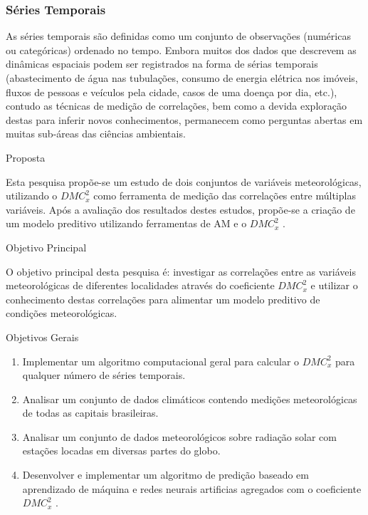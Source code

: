 \documentclass[11pt, aspectratio=169]{beamer}
\newcommand{\dmc}{\(DMC_x^2\) }
\begin{document}
\begin{frame}
  \frametitle{Séries Temporais}

  As séries temporais são definidas como um conjunto de observações (numéricas ou categóricas) ordenado no tempo.  Embora muitos dos dados que descrevem as dinâmicas espaciais podem ser registrados na forma de sérias temporais (abastecimento de água nas tubulações, consumo de energia elétrica nos imóveis, fluxos de pessoas e veículos pela cidade, casos de uma doença por dia, etc.), contudo as técnicas de medição de correlações, bem como a devida exploração destas para inferir novos conhecimentos, permanecem como perguntas abertas em muitas sub-áreas das ciências ambientais\cite{Bermudez-Edo2018}.

\end{frame}

\begin{frame}{Proposta}

  Esta pesquisa propõe-se um estudo de dois conjuntos de variáveis meteorológicas, utilizando o \dmc como ferramenta de medição das correlações entre múltiplas variáveis. Após a avaliação dos resultados destes estudos, propõe-se a criação de um modelo preditivo utilizando ferramentas de AM e o \dmc.

\end{frame}

\begin{frame}{Objetivo Principal}

  O objetivo principal desta pesquisa é: investigar as correlações entre as variáveis meteorológicas de diferentes localidades através do coeficiente \dmc e utilizar o conhecimento destas correlações para alimentar um modelo preditivo de condições meteorológicas.

\end{frame}

\begin{frame}{Objetivos Gerais}

  \begin{enumerate}
    \label{enum:obj_espec}
    \item Implementar um algoritmo computacional geral para calcular o \dmc para qualquer número de séries temporais.
    \item Analisar um conjunto de dados climáticos contendo medições meteorológicas de todas as capitais brasileiras.
    \item Analisar um conjunto de dados meteorológicos sobre radiação solar com estações locadas em diversas partes do globo.
    \item Desenvolver e implementar um algoritmo de predição baseado em aprendizado de máquina e redes neurais artificias agregados com o coeficiente \dmc.
  \end{enumerate}

\end{frame}
\end{document}
